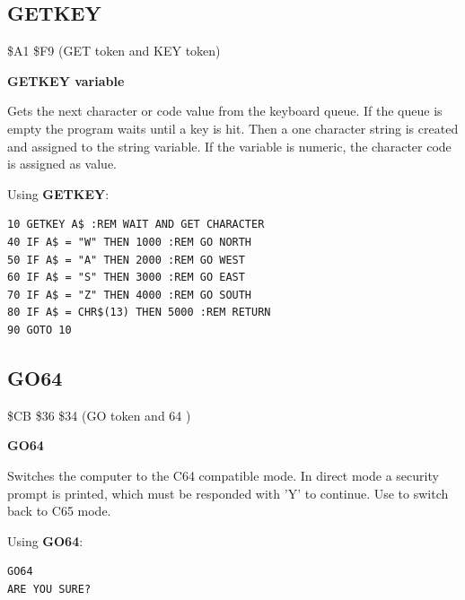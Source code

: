 \subsection{GETKEY}
\begin{description}[leftmargin=2cm,style=nextline]
\item [Token:] \$A1 \$F9 (GET token and KEY token)
\item [Format:] {\bf GETKEY variable}
\item [Usage:] Gets the next character or code value
               from the keyboard queue. If the queue is empty
               the program waits until a key is hit.
               Then a one character string is created
               and assigned to the string variable.
               If the variable is numeric, the character code
               is assigned as value.

\item [Example:] Using {\bf GETKEY}:
\begin{tcolorbox}[colback=black,coltext=white]
\verbatimfont{\codefont}
\begin{verbatim}
10 GETKEY A$ :REM WAIT AND GET CHARACTER
40 IF A$ = "W" THEN 1000 :REM GO NORTH
50 IF A$ = "A" THEN 2000 :REM GO WEST
60 IF A$ = "S" THEN 3000 :REM GO EAST
70 IF A$ = "Z" THEN 4000 :REM GO SOUTH
80 IF A$ = CHR$(13) THEN 5000 :REM RETURN
90 GOTO 10
\end{verbatim}
\end{tcolorbox}
\end{description}


\newpage
\subsection{GO64}
\begin{description}[leftmargin=2cm,style=nextline]
\item [Token:] \$CB \$36 \$34 (GO token and 64 )
\item [Format:] {\bf GO64}
\item [Usage:] Switches the
               computer to the C64 compatible mode. In direct
               mode a security prompt 
               is printed, which must be responded with 'Y' to
               continue. Use  to switch back
               to C65 mode.

\item [Example:] Using {\bf GO64}:
\begin{tcolorbox}[colback=black,coltext=white]
\verbatimfont{\codefont}
\begin{verbatim}
GO64
ARE YOU SURE?
\end{verbatim}
\end{tcolorbox}
\end{description}

